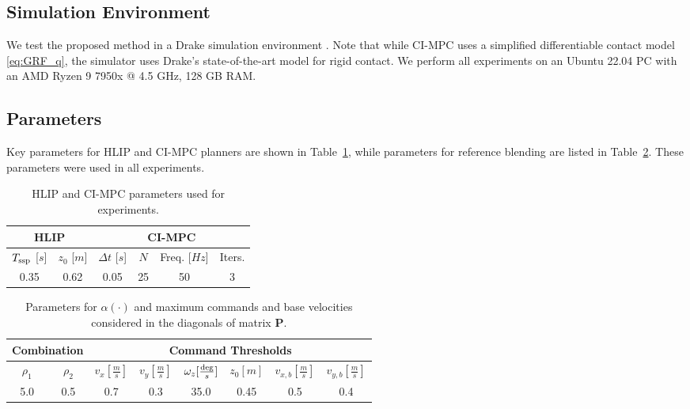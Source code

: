 \subsection{Simulation Environment}
We test the proposed method in a Drake simulation environment \cite{drake}. Note that while CI-MPC uses a simplified differentiable contact model \eqref{eq:GRF_q}, the simulator uses Drake's state-of-the-art model for rigid contact. We perform all experiments on an Ubuntu 22.04 PC with an AMD Ryzen 9 7950x @ 4.5 GHz, 128 GB RAM. 

\subsection{Parameters}

Key parameters for HLIP and CI-MPC planners are shown in Table~\ref{tab:HLIP_MPC_params}, while parameters for reference blending are listed in Table~\ref{tab:combo_parameters}. These parameters were used in all experiments.

\begin{table}
\centering
\begin{tabular}{c c |c c c c }
    \multicolumn{2}{c}{\textbf{HLIP}} & \multicolumn{4}{c}{\textbf{CI-MPC}} \\
    \hline
    $T_{\rm{ssp}}$ [$s$] & $z_0$ [$m$] & $\Delta t$ [$s$]& $N$ & Freq. [$Hz$] & Iters.\\ 
    \hline
    0.35 & 0.62 & 0.05 & 25 & 50 &  3 \\
    \hline
\end{tabular}
\caption{HLIP and CI-MPC parameters used for experiments.}
\label{tab:HLIP_MPC_params}
\end{table}

\begin{table}
\centering
\setlength{\tabcolsep}{2.5pt} %
\begin{tabular}{c c | c c c c c c}
     \multicolumn{2}{c}{\textbf{Combination}} & \multicolumn{6}{c}{\textbf{Command Thresholds}}  \\
     \hline
        $\rho_1$ & $\rho_2$ &
        $v_x [\frac{m}{s}]$ & $v_y [\frac{m}{s}]$&
        $\omega_z [\frac{\rm{deg}}{s}]$& $z_0 [m]$&
        $v_{x,b} [\frac{m}{s}]$ & $v_{y,b} [\frac{m}{s}]$ \\
    \hline
    5.0 & 0.5 & 0.7 & 0.3 & 35.0 & 0.45 & 0.5 & 0.4 \\
    \hline
\end{tabular}
 
\caption{Parameters for $\alpha(\cdot)$ and maximum commands and base velocities considered in the diagonals of matrix $\bm P$.}
\label{tab:combo_parameters}
\end{table}

